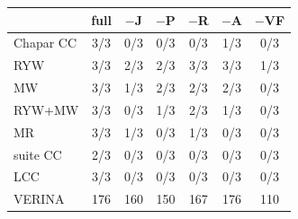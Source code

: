 \centering
\scriptsize
\setlength{\tabcolsep}{1.1pt}
\renewcommand{\arraystretch}{1.00}

\begin{tabular}{@{}l cccccc@{}}
\toprule
         & full & $-$J & $-$P & $-$R & $-$A & $-$VF \\
\midrule
\rowcolor{rowhl}
Chapar CC& 3/3 & 0/3 & 0/3 & 0/3 & 1/3 & 0/3 \\
RYW      & 3/3 & 2/3 & 2/3 & 3/3 & 3/3 & 1/3 \\
MW       & 3/3 & 1/3 & 2/3 & 2/3 & 2/3 & 0/3 \\
RYW+MW   & 3/3 & 0/3 & 1/3 & 2/3 & 1/3 & 0/3 \\
MR       & 3/3 & 1/3 & 0/3 & 1/3 & 0/3 & 0/3 \\
\sys{} suite CC& 2/3 & 0/3 & 0/3 & 0/3 & 0/3 & 0/3 \\
LCC      & 3/3 & 0/3 & 0/3 & 0/3 & 0/3 & 0/3 \\
\midrule
\rowcolor{rowhl}
VERINA   & 176 & 160 & 150 & 167 & 176 & 110 \\
\bottomrule
\end{tabular}
\label{tab:eval-ablation}

